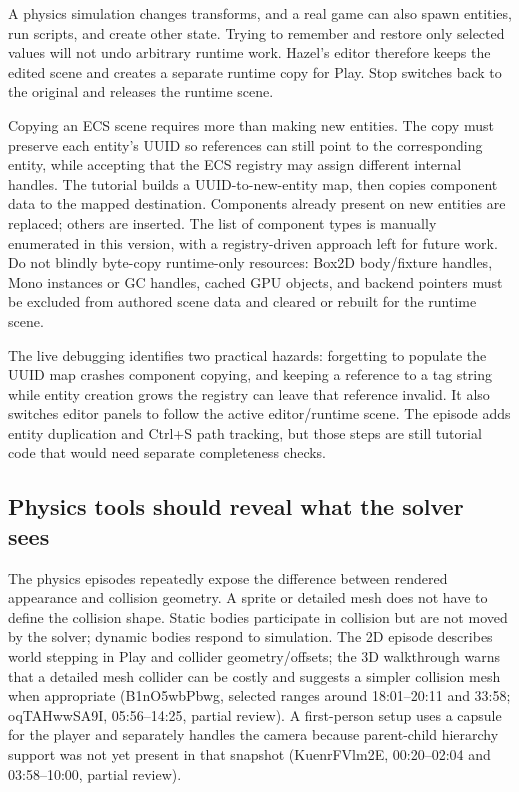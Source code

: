 \hypertarget{06-engine-ii-ch033-run-a-copy-so-play-cannot-damage-the-edited-scene}{}

A physics simulation changes transforms, and a real game can also spawn entities, run scripts, and create other state. Trying to remember and restore only selected values will not undo arbitrary runtime work. Hazel's editor therefore keeps the edited scene and creates a separate runtime copy for Play. Stop switches back to the original and releases the runtime scene.

Copying an ECS scene requires more than making new entities. The copy must preserve each entity's UUID so references can still point to the corresponding entity, while accepting that the ECS registry may assign different internal handles. The tutorial builds a UUID-to-new-entity map, then copies component data to the mapped destination. Components already present on new entities are replaced; others are inserted. The list of component types is manually enumerated in this version, with a registry-driven approach left for future work. Do not blindly byte-copy runtime-only resources: Box2D body/fixture handles, Mono instances or GC handles, cached GPU objects, and backend pointers must be excluded from authored scene data and cleared or rebuilt for the runtime scene.

The live debugging identifies two practical hazards: forgetting to populate the UUID map crashes component copying, and keeping a reference to a tag string while entity creation grows the registry can leave that reference invalid. It also switches editor panels to follow the active editor/runtime scene. The episode adds entity duplication and Ctrl+S path tracking, but those steps are still tutorial code that would need separate completeness checks.

\subsection{Physics tools should reveal what the solver sees}\label{06-engine-ii-ch033-physics-tools-should-reveal-what-the-solver-sees}

\hypertarget{06-engine-ii-ch033-physics-tools-should-reveal-what-the-solver-sees}{}

The physics episodes repeatedly expose the difference between rendered appearance and collision geometry. A sprite or detailed mesh does not have to define the collision shape. Static bodies participate in collision but are not moved by the solver; dynamic bodies respond to simulation. The 2D episode describes world stepping in Play and collider geometry/offsets; the 3D walkthrough warns that a detailed mesh collider can be costly and suggests a simpler collision mesh when appropriate (B1nO5wbPbwg, selected ranges around 18:01--20:11 and 33:58; oqTAHwwSA9I, 05:56--14:25, partial review). A first-person setup uses a capsule for the player and separately handles the camera because parent-child hierarchy support was not yet present in that snapshot (KuenrFVlm2E, 00:20--02:04 and 03:58--10:00, partial review).

